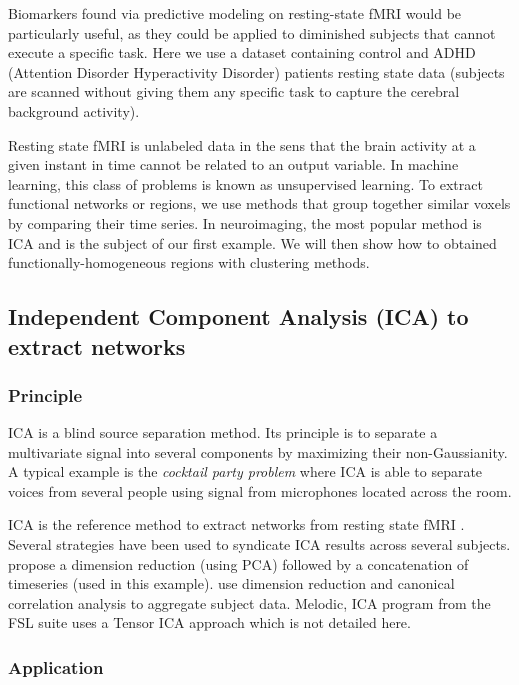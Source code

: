 \documentclass{frontiersSCNS} %
\begin{document}
Biomarkers found via predictive modeling on resting-state fMRI would be
particularly useful, as they could be applied to diminished subjects that
cannot execute a specific task. Here we use a dataset containing control
and ADHD (Attention Disorder Hyperactivity Disorder) patients resting
state data (subjects are scanned without giving them any specific task to
capture the cerebral background activity).

Resting state fMRI is unlabeled data in the sens that the brain activity
at a given instant in time cannot be related to an output variable.
In machine learning, this class of problems is known as unsupervised
learning. 
To extract functional networks or regions, we use methods that group together 
similar voxels by comparing their time
series. In neuroimaging, the most popular method is ICA and
is the subject of our first example. We will then show how to obtained 
functionally-homogeneous regions with
clustering methods.

\subsection{Independent Component Analysis (ICA) to extract networks}

\subsubsection{Principle}

ICA is a blind source separation method. Its principle is to separate a
multivariate signal into several components by maximizing their non-Gaussianity.
A typical example is the \emph{cocktail party problem} where ICA is able to separate
voices from several people using signal from microphones located across the room.

ICA is the reference method to extract networks from resting state
fMRI \citep{kiviniemi2003}. Several strategies have been used to syndicate ICA
results across several subjects. \cite{calhoun2001a} propose a dimension
reduction (using PCA) followed by a concatenation of timeseries (used in this
example). \cite{varoquaux2010} use dimension reduction and canonical correlation analysis
to aggregate subject data. Melodic, ICA program from the FSL suite uses a Tensor
ICA approach which is not detailed here.

\subsubsection{Application}
\end{document}
